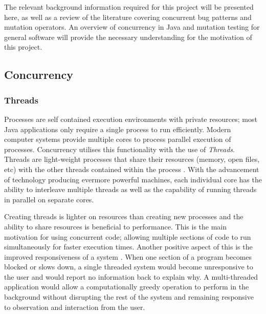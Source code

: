 \documentclass[a4paper,12pt]{article}
\begin{document}
The relevant background information required for this project will be presented here, as well as a review of the literature covering concurrent bug patterns and mutation operators. An overview of concurrency in Java and mutation testing for general software will provide the necessary understanding for the motivation of this project.  


\subsection{Concurrency}
\subsubsection{Threads}

Processes are self contained execution environments with private resources; most Java applications only require a single process to run efficiently. Modern computer systems provide multiple cores to process parallel execution of processes. Concurrency utilises this functionality with the use of \textit{Threads}. Threads are light-weight processes that share their resources (memory, open files, etc) with the other threads contained within the process \citep{mois15}. With the advancement of technology producing evermore powerful machines, each individual core has the ability to interleave multiple threads as well as the capability of running threads in parallel on separate cores. 

Creating threads is lighter on resources than creating new processes and the ability to share resources is beneficial to performance. This is the main motivation for using concurrent code; allowing multiple sections of code to run simultaneously for faster execution times. Another positive aspect of this is the improved responsiveness of a system \citep{peierls05}. When one section of a program becomes blocked or slows down, a single threaded system would become unresponsive to the user and would report no information back to explain why. A multi-threaded application would allow a computationally greedy operation to perform in the background without disrupting the rest of the system and remaining responsive to observation and interaction from the user.
\end{document}
